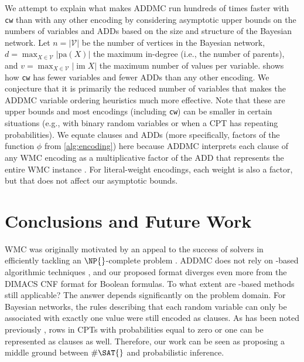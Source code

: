 \documentclass{uai2021} %
\theoremstyle{definition}
\DeclareMathOperator{\im}{im}
\begin{document}
We attempt to explain what makes \textsf{ADDMC} run hundreds of times faster
with \texttt{cw} than with any other encoding by considering asymptotic upper
bounds on the numbers of variables and ADDs based on the size and structure of
the Bayesian network. Let $n = |\mathcal{V}|$ be the number of vertices in the
Bayesian network, $d = \max_{X \in \mathcal{V}} |\mathrm{pa}(X)|$ the maximum
in-degree (i.e., the number of parents), and $v = \max_{X \in \mathcal{V}} |\im
X|$ the maximum number of values per variable.  shows how
\texttt{cw} has fewer variables and fewer ADDs than any other encoding. We
conjecture that it is primarily the reduced number of variables that makes the
\textsf{ADDMC} variable ordering heuristics much more effective. Note that these
are upper bounds and most encodings (including \texttt{cw}) can be smaller in
certain situations (e.g., with binary random variables or when a CPT has
repeating probabilities). We equate clauses and ADDs (more specifically, factors
of the function $\phi$ from \cref{alg:encoding}) here because \textsf{ADDMC}
interprets each clause of any WMC encoding as a multiplicative factor of the ADD
that represents the entire WMC instance \citep{DBLP:conf/aaai/DudekPV20}. For
literal-weight encodings, each weight is also a factor, but that does not affect
our asymptotic bounds.

\section{Conclusions and Future Work}

WMC was originally motivated by an appeal to the success of \SAT{} solvers in
efficiently tackling an $\NP{}$-complete problem
\citep{DBLP:conf/aaai/SangBK05}. \textsf{ADDMC} does not rely on \SAT{}-based
algorithmic techniques \citep{DBLP:conf/aaai/DudekPV20}, and our proposed format
diverges even more from the DIMACS CNF format for Boolean formulas. To what
extent are \SAT{}-based methods still applicable? The answer depends
significantly on the problem domain. For Bayesian networks, the rules describing
that each random variable can only be associated with exactly one value were
still encoded as clauses. As has been noted previously
\citep{DBLP:conf/sat/ChaviraD06}, rows in CPTs with probabilities equal to zero
or one can be represented as clauses as well. Therefore, our work can be seen as
proposing a middle ground between $\#\SAT{}$ and probabilistic inference.
\end{document}
